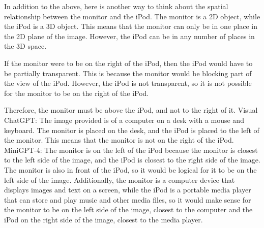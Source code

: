 \begin{enumerate}
    In addition to the above, here is another way to think about the spatial relationship between the monitor and the iPod. The monitor is a 2D object, while the iPod is a 3D object. This means that the monitor can only be in one place in the 2D plane of the image. However, the iPod can be in any number of places in the 3D space.

    If the monitor were to be on the right of the iPod, then the iPod would have to be partially transparent. This is because the monitor would be blocking part of the view of the iPod. However, the iPod is not transparent, so it is not possible for the monitor to be on the right of the iPod.

    Therefore, the monitor must be above the iPod, and not to the right of it.
    \subitem Visual ChatGPT: The image provided is of a computer on a desk with a mouse and keyboard. The monitor is placed on the desk, and the iPod is placed to the left of the monitor. This means that the monitor is not on the right of the iPod.
    \subitem MiniGPT-4: The monitor is on the left of the iPod because the monitor is closest to the left side of the image, and the iPod is closest to the right side of the image. The monitor is also in front of the iPod, so it would be logical for it to be on the left side of the image. Additionally, the monitor is a computer device that displays images and text on a screen, while the iPod is a portable media player that can store and play music and other media files, so it would make sense for the monitor to be on the left side of the image, closest to the computer and the iPod on the right side of the image, closest to the media player.
\end{enumerate}
